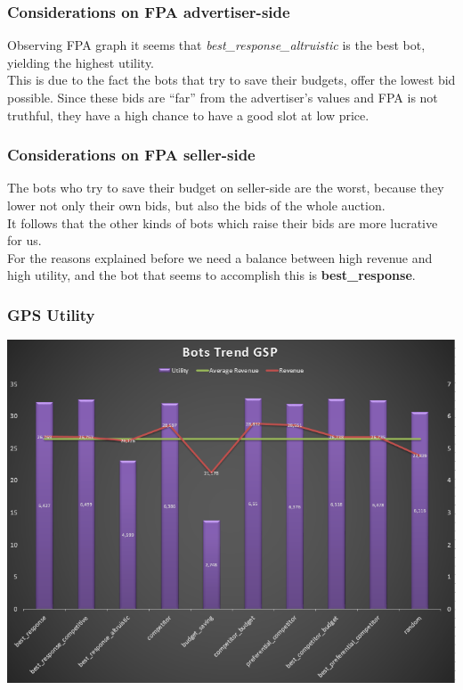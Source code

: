 \documentclass{beamer}
\begin{document}
\begin{frame}
\frametitle{Considerations on FPA advertiser-side }
Observing FPA graph it seems that \textit{best\_response\_altruistic} is the best bot, yielding the \alert{highest} utility.\\
\medskip
This is due to the fact the bots that try to save their budgets, offer the lowest bid possible.
Since these bids are ``far'' from the advertiser's values and FPA is not truthful, they have a high chance to have a good slot at low price. 
\end{frame}

\begin{frame}
\frametitle{Considerations on FPA seller-side}
The bots who try to save their budget on seller-side are the \alert{worst}, because they lower not only their own bids, but also the bids of the whole auction.\\
\medskip
It follows that the other kinds of bots which raise their bids are more \alert{lucrative} for us.\\
\medskip
For the reasons explained before we need a balance between high revenue and high utility, and the bot that seems to accomplish this is \textbf{best\_response}.
\end{frame}

\begin{frame}
\frametitle{GPS Utility}
\begin{center}
\includegraphics[scale=0.46]{img/Auctions/GSP_all_Utility.PNG} 
\end{center}
\end{frame}
\end{document}
